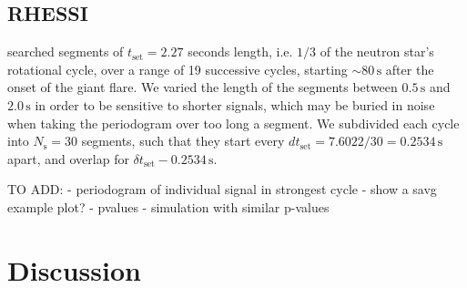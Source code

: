 \documentclass{emulateapj}
\begin{document}
\subsection{RHESSI}
\label{sec:rhessi_results}

\citealt{watts06} searched segments of $t_{\mathrm{set}} = 2.27$ seconds length, i.e. $1/3$ of the neutron star's rotational cycle, over a range of 19 successive cycles, starting $\sim 80 \, \mathrm{s}$ after the onset of the giant flare. We varied the length of the segments between $0.5 \, \mathrm{s}$ and $2.0 \, \mathrm{s}$ in order to be sensitive to shorter signals, which may be buried in noise when taking the periodogram over too long a segment. We subdivided each cycle into $N_\mathrm{s} = 30$ segments, such that they start every $d t_\mathrm{set}= 7.6022/30 = 0.2534 \, \mathrm{s}$ apart, and overlap for $\delta t_\mathrm{set} - 0.2534 \, \mathrm{s}$.


TO ADD:
- periodogram of individual signal in strongest cycle
- show a savg example plot?
- pvalues
- simulation with similar p-values


\section{Discussion}
\label{sec:discussion}
\end{document}
